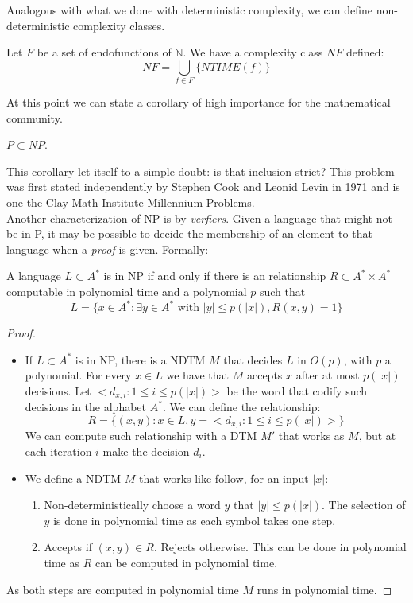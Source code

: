 Analogous with what we done with deterministic complexity, we can define non-deterministic complexity classes.

\begin{definition}
  Let $F$ be a set of endofunctions of $\mathbb{N}$. We have a complexity class $NF$ defined:
  $$NF =  \bigcup_{f \in F} \{ NTIME(f)\} $$
\end{definition}

At this point we can state a corollary of high importance for the mathematical community.

\begin{corollary}
  $P \subset NP$.
\end{corollary}

This corollary let itself to a simple doubt: is that inclusion strict? This problem was first stated independently by Stephen Cook and  Leonid Levin in 1971\cite{cook2006p} and is one the Clay Math Institute Millennium Problems.\\

Another characterization of NP is by \emph{verfiers}. Given a language that might not be in P, it may be possible to decide the membership of an element to that language when a \emph{proof} is given. Formally:

\begin{proposition}
  A language $L\subset A^*$ is in NP if and only if there is an relationship $R\subset A^*\times A^*$  computable in polynomial time and a polynomial $p$ such that
  $$L = \{x \in A^*:\exists y \in A^* \text{ with } |y | \le p(|x|), R(x, y) = 1\}$$
\end{proposition}
\begin{proof}\hfill
\begin{itemize}
\item[\fbox{$\Rightarrow$}] If $L\subset A^*$ is in NP, there is a NDTM $M$ that decides $L$ in $O(p)$, with $p$ a polynomial. For every $x\in L$ we have that $M$ accepts $x$ after at most $p(|x|)$ decisions. Let $<d_{x,i} : 1 \le i \le p(|x|)>$ be the word that codify such decisions in the alphabet $A^*$. We can define the relationship:
  $$R = \{(x,y)  : x \in L, y = <d_{x,i} : 1 \le i \le p(|x|)>\}$$
  We can compute such relationship with a DTM $M'$ that works as $M$, but at each iteration $i$ make the decision $d_i$. 
\item[\fbox{$\Leftarrow$}] We define a NDTM $M$ that works like follow, for an input $|x|$:
  \begin{enumerate}
  \item Non-deterministically choose a word $y$ that $|y|\le p(|x|)$. The selection of $y$ is done in polynomial time as each symbol takes one step.
  \item Accepts if $(x,y)\in R$. Rejects otherwise. This can be done in polynomial time as $R$ can be computed in polynomial time.
    \end{enumerate}
  \end{itemize}
  As both steps are computed in polynomial time $M$ runs in polynomial time.  
\end{proof}

